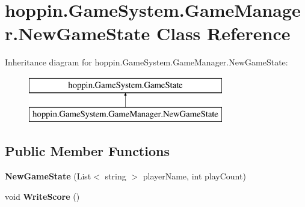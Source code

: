 \hypertarget{classhoppin_1_1_game_system_1_1_game_manager_1_1_new_game_state}{}\section{hoppin.\+Game\+System.\+Game\+Manager.\+New\+Game\+State Class Reference}
\label{classhoppin_1_1_game_system_1_1_game_manager_1_1_new_game_state}
Inheritance diagram for hoppin.\+Game\+System.\+Game\+Manager.\+New\+Game\+State\+:\begin{figure}[H]
\begin{center}
\leavevmode
\includegraphics[height=2.000000cm]{classhoppin_1_1_game_system_1_1_game_manager_1_1_new_game_state}
\end{center}
\end{figure}
\subsection*{Public Member Functions}
\begin{DoxyCompactItemize}
\item 
{\bfseries New\+Game\+State} (List$<$ string $>$ player\+Name, int play\+Count)\hypertarget{classhoppin_1_1_game_system_1_1_game_manager_1_1_new_game_state_a8ad787b2a553fc1d07d896508a6f3737}{}\label{classhoppin_1_1_game_system_1_1_game_manager_1_1_new_game_state_a8ad787b2a553fc1d07d896508a6f3737}

\item 
void {\bfseries Write\+Score} ()\hypertarget{classhoppin_1_1_game_system_1_1_game_manager_1_1_new_game_state_a75d1b6cd26e9ad0a1e0d221ce799265d}{}\label{classhoppin_1_1_game_system_1_1_game_manager_1_1_new_game_state_a75d1b6cd26e9ad0a1e0d221ce799265d}

\end{DoxyCompactItemize}
